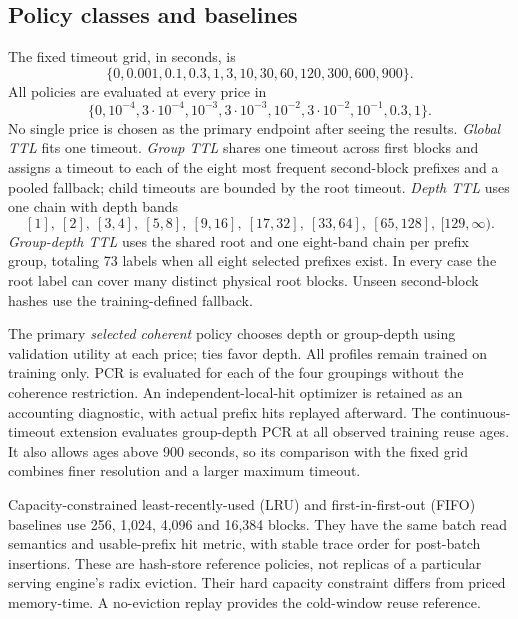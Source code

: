 \documentclass[11pt,a4paper]{article}
\begin{document}
\subsection{Policy classes and baselines}
The fixed timeout grid, in seconds, is
\[
\{0,0.001,0.1,0.3,1,3,10,30,60,120,300,600,900\}.
\]
All policies are evaluated at every price in
\[
\{0,10^{-4},3\!\cdot\!10^{-4},10^{-3},3\!\cdot\!10^{-3},10^{-2},
3\!\cdot\!10^{-2},10^{-1},0.3,1\}.
\]
No single price is chosen as the primary endpoint after seeing the results.
\emph{Global TTL} fits one timeout. \emph{Group TTL} shares one timeout across
first blocks and assigns a timeout to each of the eight most frequent second-block
prefixes and a pooled fallback; child timeouts are bounded by the root timeout.
\emph{Depth TTL} uses one chain with depth bands
\[
[1],\ [2],\ [3,4],\ [5,8],\ [9,16],\ [17,32],\ [33,64],\ [65,128],\ [129,\infty).
\]
\emph{Group-depth TTL} uses the shared root and one eight-band chain per prefix
group, totaling 73 labels when all eight selected prefixes exist. In every case
the root label can cover many distinct physical root blocks. Unseen second-block
hashes use the training-defined fallback.

The primary \emph{selected coherent} policy chooses depth or group-depth using
validation utility at each price; ties favor depth. All profiles remain trained
on training only. PCR is evaluated for each of the four groupings without the
coherence restriction. An independent-local-hit optimizer is retained as an
accounting diagnostic, with actual prefix hits replayed afterward. The
continuous-timeout extension evaluates group-depth PCR at all observed training
reuse ages. It also allows ages above 900 seconds, so its comparison with the
fixed grid combines finer resolution and a larger maximum timeout.

Capacity-constrained least-recently-used (LRU) and first-in-first-out (FIFO)
baselines use 256, 1,024, 4,096 and 16,384 blocks. They have the same batch read
semantics and usable-prefix hit metric, with stable trace order for post-batch
insertions. These are hash-store reference policies, not replicas of a particular
serving engine's radix eviction. Their hard capacity constraint differs from
priced memory-time. A no-eviction replay provides the cold-window reuse reference.
\end{document}
